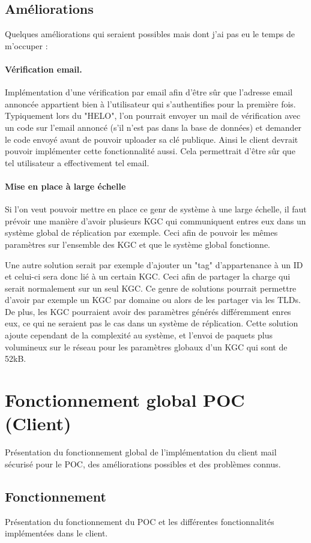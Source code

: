 \subsection{Améliorations}
Quelques améliorations qui seraient possibles mais dont j'ai pas eu le temps de m'occuper :
\paragraph*{Vérification email.}
Implémentation d'une vérification par email afin d'être sûr que l'adresse email annoncée appartient bien à l'utilisateur qui s'authentifies pour la première fois. Typiquement lors du "HELO", l'on pourrait envoyer un mail de vérification avec un code sur l'email annoncé (s'il n'est pas dans la base de données) et demander le code envoyé avant de pouvoir uploader sa clé publique. Ainsi le client devrait pouvoir implémenter cette fonctionnalité aussi. Cela permettrait d'être sûr que tel utilisateur a effectivement tel email.
\paragraph*{Mise en place à large échelle}
Si l'on veut pouvoir mettre en place ce genr de système à une large échelle, il faut prévoir une manière d'avoir plusieurs KGC qui communiquent entres eux dans un système global de réplication par exemple. Ceci afin de pouvoir les mêmes paramètres sur l'ensemble des KGC et que le système global fonctionne.

Une autre solution serait par exemple d'ajouter un "tag" d'appartenance à un ID et celui-ci sera donc lié à un certain KGC. Ceci afin de partager la charge qui serait normalement sur un seul KGC. Ce genre de solutions pourrait permettre d'avoir par exemple un KGC par domaine ou alors de les partager via les TLDs. De plus, les KGC pourraient avoir des paramètres générés différemment enres eux, ce qui ne seraient pas le cas dans un système de réplication. Cette solution ajoute cependant de la complexité au système, et l'envoi de paquets plus volumineux sur le réseau pour les paramètres globaux d'un KGC qui sont de 52kB.
\section{Fonctionnement global POC (Client)}
Présentation du fonctionnement global de l'implémentation du client mail sécurisé pour le POC, des améliorations possibles et des problèmes connus.
\subsection{Fonctionnement}
Présentation du fonctionnement du POC et les différentes fonctionnalités implémentées dans le client.
